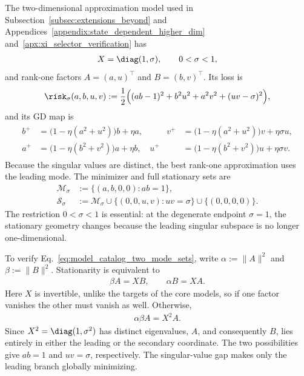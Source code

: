 \documentclass{article}
\begin{document}
The two-dimensional approximation model used in
Subsection~\ref{subsec:extensions_beyond} and
Appendices~\ref{appendix:state_dependent_higher_dim}
and~\ref{apx:xi_selector_verification} has
\begin{align}
    X=\diag(1,\sigma),
    \qquad
    0<\sigma<1,
\end{align}
and rank-one factors $A=(a,u)^\top$ and $B=(b,v)^\top$. Its loss is
\begin{align}
    \risk_\sigma(a,b,u,v)
    :=\frac12\Bigl((ab-1)^2+b^2u^2+a^2v^2+(uv-\sigma)^2\Bigr),
    \label{eq:model_catalog_two_mode_loss}
\end{align}
and its GD map is
\begin{align}
\begin{aligned}
    b^+&=\bigl(1-\eta(a^2+u^2)\bigr)b+\eta a,
    &\qquad
    v^+&=\bigl(1-\eta(a^2+u^2)\bigr)v+\eta\sigma u,\\
    a^+&=\bigl(1-\eta(b^2+v^2)\bigr)a+\eta b,
    &
    u^+&=\bigl(1-\eta(b^2+v^2)\bigr)u+\eta\sigma v.
\end{aligned}
\label{eq:model_catalog_two_mode_gd}
\end{align}
Because the singular values are distinct, the best rank-one approximation uses
the leading mode. The minimizer and full stationary sets are
\begin{align}
    \mathcal M_\sigma
    &:=\{(a,b,0,0):ab=1\},\\
    \mathcal S_\sigma
    &:=\mathcal M_\sigma
      \cup\{(0,0,u,v):uv=\sigma\}
      \cup\{(0,0,0,0)\}.
    \label{eq:model_catalog_two_mode_sets}
\end{align}
The restriction $0<\sigma<1$ is essential:
at the degenerate endpoint $\sigma=1$, the stationary geometry changes because
the leading singular subspace is no longer one-dimensional.

To verify Eq.~\eqref{eq:model_catalog_two_mode_sets}, write
$\alpha:=\|A\|^2$ and $\beta:=\|B\|^2$. Stationarity is equivalent to
\begin{align}
    \beta A=XB,
    \qquad
    \alpha B=XA.
\end{align}
Here $X$ is invertible, unlike the targets of the core models, so if one factor
vanishes the other must vanish as well. Otherwise,
\begin{align}
    \alpha\beta A=X^2A.
\end{align}
Since $X^2=\diag(1,\sigma^2)$ has distinct eigenvalues, $A$, and consequently
$B$, lies entirely in either the leading or the secondary coordinate. The two
possibilities give $ab=1$ and $uv=\sigma$, respectively. The singular-value
gap makes only the leading branch globally minimizing.
\end{document}
